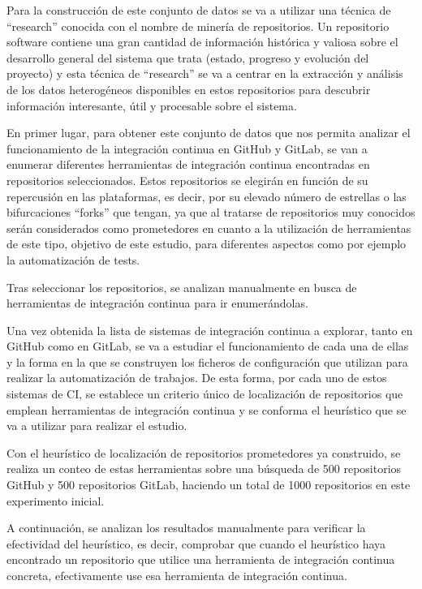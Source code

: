 Para la construcción de este conjunto de datos se va a utilizar una técnica de ``research'' conocida con el nombre de minería de repositorios.
Un repositorio software contiene una gran cantidad de información histórica y valiosa sobre el desarrollo general del sistema que trata (estado, progreso y evolución del proyecto) y esta técnica de ``research'' se va a centrar en la extracción y análisis de los datos heterogéneos disponibles en estos repositorios para descubrir información interesante, útil y procesable sobre el sistema.

En primer lugar, para obtener este conjunto de datos que nos permita analizar el funcionamiento de la integración continua en GitHub y GitLab, se van a enumerar diferentes herramientas de integración continua encontradas en repositorios seleccionados. 
Estos repositorios se elegirán en función de su repercusión en las plataformas, es decir, por su elevado número de estrellas o las bifurcaciones ``forks'' que tengan, ya que al tratarse de repositorios muy conocidos serán considerados como prometedores en cuanto a la utilización de herramientas de este tipo, objetivo de este estudio, para diferentes aspectos como por ejemplo la automatización de tests.

Tras seleccionar los repositorios, se analizan manualmente en busca de herramientas de integración continua para ir enumerándolas.

Una vez obtenida la lista de sistemas de integración continua a explorar, tanto en GitHub como en GitLab, se va a estudiar el funcionamiento de cada una de ellas y la forma en la que se construyen los ficheros de configuración que utilizan para realizar la automatización de trabajos. De esta forma, por cada uno de estos sistemas de CI, se establece un criterio único de localización de repositorios que emplean herramientas de integración continua y se conforma el heurístico que se va a utilizar para realizar el estudio.

Con el heurístico de localización de repositorios prometedores ya construido, se realiza un conteo de estas herramientas sobre una búsqueda de 500 repositorios GitHub y 500 repositorios GitLab, haciendo un total de 1000 repositorios en este experimento inicial.

A continuación, se analizan los resultados manualmente para verificar la efectividad del heurístico, es decir, comprobar que cuando el heurístico haya encontrado un repositorio que utilice una herramienta de integración continua concreta, efectivamente use esa herramienta de integración continua.

